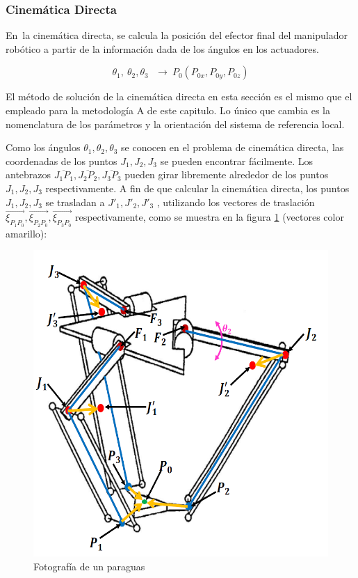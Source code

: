         \newpage


\subsubsection{Cinemática Directa}\label{mb_cd}
        
        En\ la cinemática directa, se calcula la posición del efector final del manipulador robótico a partir de la información dada de los ángulos en los actuadores.


        \begin{equation}
            \theta _{1},~ \theta _{2}, \theta _{3}~~~ \rightarrow ~  {P_{0}} \left( P_{0x},P_{0y},P_{0z} \right)
        \label{eq:cap4_MB_1}
        \end{equation}

        El método de solución de la cinemática directa en esta sección es el mismo que el empleado para la metodología A de este capitulo. Lo único que cambia es la nomenclatura de los parámetros y la orientación del sistema de referencia local.
        
        Como los ángulos   $\theta_1,\theta_2,\theta_3$  se conocen en el problema de cinemática directa, las coordenadas de los puntos $J_1,J_2,J_3$   se pueden encontrar fácilmente. Los antebrazos   $\overline{J_1P_1},\overline{J_2P_2},\overline{J_3P_3}$   pueden girar libremente alrededor de los puntos $J_1,J_2,J_3$   respectivamente. A fin de que calcular la cinemática directa, los puntos  $J_1,J_2,J_3$   se trasladan a  $J'_1,J'_2,J'_3$ , utilizando los vectores de traslación $\overrightarrow{\xi_{P_1 P_0}},\overrightarrow{\xi_{P_2P_0}},\overrightarrow{\xi_{P_3 P_0}}$    respectivamente, como se muestra en la figura \ref{f:Cap4_Metodo_B_Modelacion_Cinematica_Posicion_3} (vectores color amarillo):
        
            \begin{figure}[htb]
                 \centering
               \includegraphics[width=0.7\linewidth]{Main/Chapter4/Images4/DIBUJO28.png}
                  \caption{Fotografía de un paraguas}
                  \label{f:Cap4_Metodo_B_Modelacion_Cinematica_Posicion_3}
            \end{figure}        

